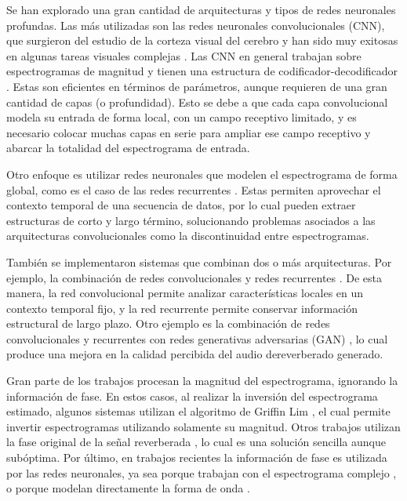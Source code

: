Se han explorado una gran cantidad de arquitecturas y tipos de redes neuronales profundas. Las más utilizadas son las redes neuronales convolucionales (CNN), que surgieron del estudio de la corteza visual del cerebro y han sido muy exitosas en algunas tareas visuales complejas \cite{lagartija}.  Las CNN en general trabajan sobre espectrogramas de magnitud y tienen una estructura de codificador-decodificador \cite{FCN, rir_filtinverso}. Estas son eficientes en términos de parámetros, aunque requieren de una gran cantidad de capas (o profundidad). Esto se debe a que cada capa convolucional modela su entrada de forma local, con un campo receptivo limitado, y es necesario colocar muchas capas en serie para ampliar ese campo receptivo y abarcar la totalidad del espectrograma de entrada. 

Otro enfoque es utilizar redes neuronales que modelen el espectrograma de forma global, como es el caso de las redes recurrentes \cite{RNN}. Estas permiten aprovechar el contexto temporal de una secuencia de datos, por lo cual pueden extraer estructuras de corto y largo término, solucionando problemas asociados a las arquitecturas convolucionales como la discontinuidad entre espectrogramas.


También se implementaron sistemas que combinan dos o más arquitecturas. Por ejemplo, la combinación de redes convolucionales y redes recurrentes \cite{RNN+CNN}. De esta manera, la red convolucional permite analizar características locales en un contexto temporal fijo, y la red recurrente permite conservar información estructural de largo plazo. Otro ejemplo es la combinación de redes convolucionales y recurrentes con redes generativas adversarias (GAN) \cite{GAN}, lo cual produce una mejora en la calidad percibida del audio dereverberado generado. 

Gran parte de los trabajos procesan la magnitud del espectrograma, ignorando la información de fase. En estos casos, al realizar la inversión del espectrograma estimado, algunos sistemas \cite{ezeKun} utilizan el algoritmo de Griffin Lim \cite{griffinlim}, el cual permite invertir espectrogramas utilizando solamente su magnitud. Otros trabajos utilizan la fase original de la señal reverberada \cite{CNN, FCN, skip, rir_filtinverso}, lo cual es una solución sencilla aunque subóptima. Por último, en trabajos recientes la información de fase es utilizada por las redes neuronales, ya sea porque trabajan con el espectrograma complejo \cite{cIRM}, o porque modelan directamente la forma de onda \cite{hifiGAN}.